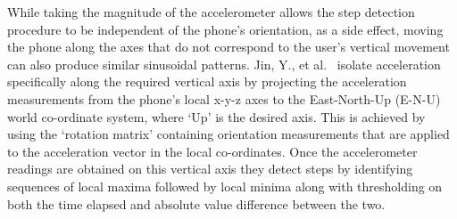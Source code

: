 \documentclass[12pt,a4paper]{report}
\begin{document}
While taking the magnitude of the accelerometer allows the step detection procedure to be independent of the phone’s orientation, as a side effect, moving the phone along the axes that do not correspond to the user’s vertical movement can also produce similar sinusoidal patterns. Jin, Y., et al.~\cite{jin2011robust} isolate acceleration specifically along the required vertical axis by projecting the acceleration measurements from the phone’s local x-y-z axes to the East-North-Up (E-N-U) world co-ordinate system, where `Up' is the desired axis.  This is achieved by using the `rotation matrix' containing orientation measurements that are applied to the acceleration vector in the local co-ordinates. Once the accelerometer readings are obtained on this vertical axis they detect steps by identifying sequences of local maxima followed by local minima along with thresholding on both the time elapsed and absolute value difference between the two. 
\end{document}
